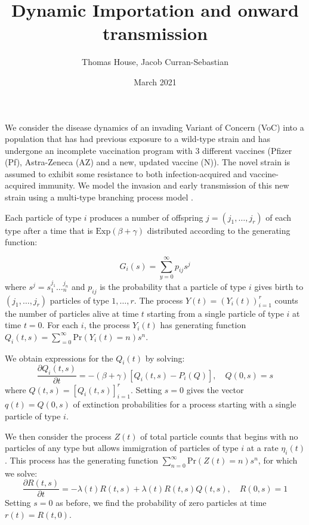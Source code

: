 \documentclass{article}
\title{Dynamic Importation and onward transmission}
\author{Thomas House, \quad Jacob Curran-Sebastian }
\date{March 2021}
\begin{document}
\maketitle

We consider the disease dynamics of an invading Variant of Concern (VoC) into a population that has had previous exposure to a wild-type strain and has undergone an incomplete vaccination program with 3 different vaccines (Pfizer (Pf), Astra-Zeneca (AZ) and a new, updated vaccine (N)). The novel strain is assumed to exhibit some resistance to both infection-acquired and vaccine-acquired immunity. We model the invasion and early transmission of this new strain using a multi-type branching process model \cite{dorman2004garden}. 

Each particle of type $i$ produces a number of offspring $j = (j_1, \dots, j_r)$ of each type after a time that is ${\mathrm{Exp}}(\beta+\gamma)$ distributed according to the generating function:

\begin{equation} \label{offspring}
G_i(s) = \sum_{y=0}^\infty p_{ij}s^j
\end{equation}
where $s^j = s_1^{j_1}\dots_n^{j_n}$ and $p_{ij}$ is the probability that a particle of type $i$ gives birth to $(j_1, \dots,j_r) $ particles of type $1, \dots, r$. The process $Y(t) = (Y_i(t))_{i=1}^r$ counts the number of particles alive at time $t$ starting from a single particle of type $i$ at time $t=0$. For each $i$, the process $Y_i(t)$ has generating function $Q_i(t, s) = \sum_{=0}^\infty{\mathrm{Pr}}(Y_i(t) = n)s^n$. 

We obtain expressions for the $Q_i(t)$ by solving:
\begin{equation}
    \frac{\partial Q_i(t, s)}{\partial t} = -(\beta + \gamma)[Q_i(t, s) - P_i(Q)], \quad Q(0, s) = s \label{Qeq}
\end{equation}
where $Q(t, s) = [Q_i(t, s)]_{i=1}^r$. Setting $s=0$ gives the vector  $q(t) = Q(0, s)$ of extinction probabilities for a process starting with a single particle of type $i$. 

We then consider the process $Z(t)$ of total particle counts that begins with no particles of any type but allows immigration of particles of type $i$ at a rate $\eta_i(t)$. This process has the generating function $\sum_{n=0}^\infty {\mathrm{Pr}}(Z(t) = n)s^n$, for which we solve:
\begin{equation}
    \frac{\partial R(t, s)}{\partial t} = -\lambda(t)R(t, s) + \lambda(t)R(t, s)Q(t, s), \quad R(0, s) = 1 \label{Req}
\end{equation}
Setting $s=0$ as before, we find the probability of zero particles at time $r(t) = R(t, 0)$.  
\end{document}
